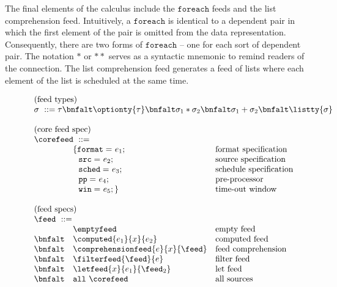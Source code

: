 The final elements of the calculus include the $\mathtt{foreach}$ feeds
and the list comprehension feed.
Intuitively, a $\mathtt{foreach}$ is identical to a dependent pair in
which the first element of the pair is omitted from the data representation.
Consequently, there are two forms of $\mathtt{foreach}$ -- one for
each sort of dependent pair.  The notation ${*}$ or ${**}$ serves as
a syntactic mnemonic to remind readers of the connection.  The list comprehension
feed generates a feed of lists where each element of the list is scheduled at the same time.

\begin{figure}[t]
\[
\begin{array}{lll}
\multicolumn{3}{l}{\mbox{(feed types)}}\\ 
\multicolumn{3}{l}{\sigma \ ::= \tau \bnfalt \optionty{\tau} 
  \bnfalt \sigma_1 * \sigma_2
  \bnfalt \sigma_1 + \sigma_2
  \bnfalt \listty{\sigma}
}   \\  
\\
\multicolumn{3}{l}{\mbox{(core feed spec)}}\\ 
\multicolumn{3}{l}{\corefeed \ ::= }\\
& \{ \mathtt{format=}\ e_1; & \mbox{format specification}\\ 
& \ \ \mathtt{src=}\ e_2;   & \mbox{source specification} \\
& \ \ \mathtt{sched=}\ e_3;  & \mbox{schedule specification}\\
& \ \ \mathtt{pp=}\ e_4;     & \mbox{pre-processor} \\
& \ \ \mathtt{win=}\ e_5; \} & \mbox{time-out window} \\
\\
\multicolumn{3}{l}{\mbox{(feed specs)}}\\ 
\multicolumn{3}{l}{\feed \ ::=}   \\  
& \emptyfeed & \mbox{empty feed} \\
 \bnfalt & \computed{e_1}{x}{e_2} & \mbox{computed feed} \\
 \bnfalt & \comprehensionfeed{e}{x}{\feed} & \mbox{feed comprehension} \\
 \bnfalt & \filterfeed{\feed}{e} & \mbox{filter feed} \\
 \bnfalt & \letfeed{x}{e_1}{\feed_2} & \mbox{let feed} \\
 \bnfalt &     \mathtt{all}\ \corefeed & \mbox{all sources}\\ 

\end{array}\]
\end{figure}
